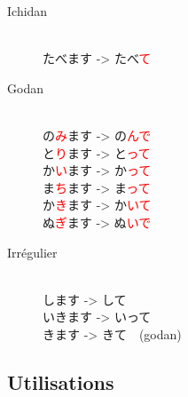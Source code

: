 \documentclass[11pt]{report}
\newenvironment{Japanese}{%
\CJKfamily{min}%
\CJKtilde  
\CJKnospace}{}
\begin{document}
\begin{CJK}{UTF8}{}  
\begin{Japanese}
	\begin{description}
		\item[Ichidan] \hfill \\
			たべます -> たべ\textcolor{red}{て}
		\item[Godan] \hfill \\
			の\textcolor{red}{み}ます -> の\textcolor{red}{んで} \\
			と\textcolor{red}{り}ます -> と\textcolor{red}{って} \\
			か\textcolor{red}{い}ます -> か\textcolor{red}{って} \\
			ま\textcolor{red}{ち}ます -> ま\textcolor{red}{って} \\
			か\textcolor{red}{き}ます -> か\textcolor{red}{いて} \\
			ぬ\textcolor{red}{ぎ}ます -> ぬ\textcolor{red}{いで}
		\item[Irrégulier] \hfill \\
			します -> して \\
			いきます -> いって \\
			きます -> きて　(godan)
	\end{description}
\end{Japanese}  
\end{CJK}

\subsection{Utilisations}
\end{document}
